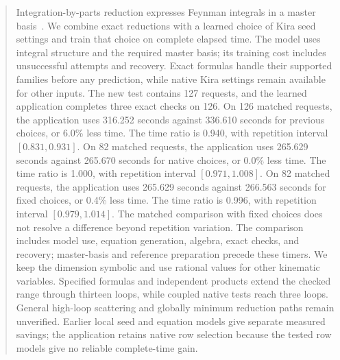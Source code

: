 \begin{abstract}
Integration-by-parts reduction expresses Feynman integrals in a master basis~\cite{KiraOriginal}. We combine exact reductions with a learned choice of Kira seed settings and train that choice on complete elapsed time. The model uses integral structure and the required master basis; its training cost includes unsuccessful attempts and recovery. Exact formulas handle their supported families before any prediction, while native Kira settings remain available for other inputs. The new test contains 127 requests, and the learned application completes three exact checks on 126. On 126 matched requests, the application uses 316.252 seconds against 336.610 seconds for previous choices, or 6.0\% less time. The time ratio is 0.940, with repetition interval $[0.831,0.931]$. On 82 matched requests, the application uses 265.629 seconds against 265.670 seconds for native choices, or 0.0\% less time. The time ratio is 1.000, with repetition interval $[0.971,1.008]$. On 82 matched requests, the application uses 265.629 seconds against 266.563 seconds for fixed choices, or 0.4\% less time. The time ratio is 0.996, with repetition interval $[0.979,1.014]$. The matched comparison with fixed choices does not resolve a difference beyond repetition variation. The comparison includes model use, equation generation, algebra, exact checks, and recovery; master-basis and reference preparation precede these timers. We keep the dimension symbolic and use rational values for other kinematic variables. Specified formulas and independent products extend the checked range through thirteen loops, while coupled native tests reach three loops. General high-loop scattering and globally minimum reduction paths remain unverified. Earlier local seed and equation models give separate measured savings; the application retains native row selection because the tested row models give no reliable complete-time gain.
\end{abstract}
